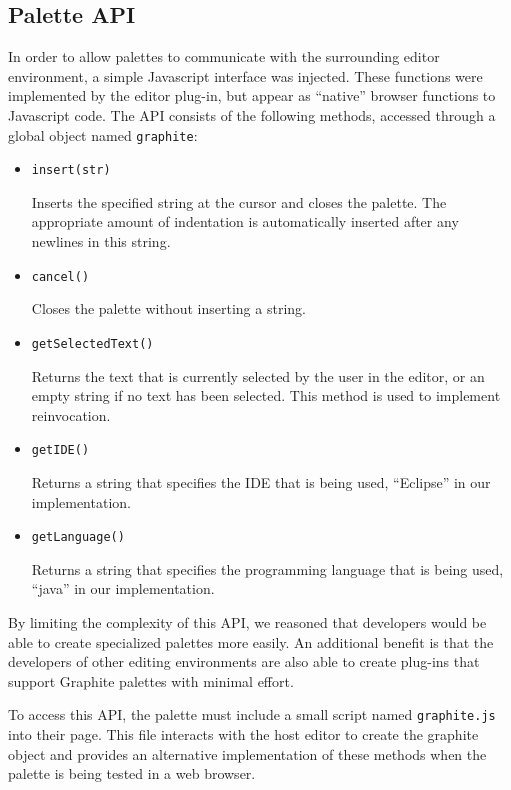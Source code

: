 \documentclass[10pt, conference, compsocconf]{IEEEtran}
\begin{document}
\subsection{Palette API}
In order to allow palettes to communicate with the surrounding editor environment, a simple Javascript interface was injected. These functions were implemented by the editor plug-in, but appear as ``native'' browser functions to Javascript code. The API consists of the following methods, accessed through a global object named \verb|graphite|:
\begin{itemize}
	\item \verb|insert(str)|
	
	Inserts the specified string at the cursor and closes the palette. The appropriate amount of indentation is automatically inserted after any newlines in this string.
	
	\item \verb|cancel()|
	
	Closes the palette without inserting a string.
	
	\item \verb|getSelectedText()|
	
	Returns the text that is currently selected by the user in the editor, or an empty string if no text has been selected. This method is used to implement reinvocation.
	
	\item \verb|getIDE()|
	
	Returns a string that specifies the IDE that is being used, ``Eclipse'' in our implementation.
	
	\item \verb|getLanguage()|
	
	Returns a string that specifies the programming language that is being used, ``java'' in our implementation.
\end{itemize}

By limiting the complexity of this API, we reasoned that developers would be able to create specialized palettes more easily. An additional benefit is that the developers of other editing environments are also able to create plug-ins that support Graphite palettes with minimal effort.

To access this API, the palette must include a small script named \verb|graphite.js| into their page. This file interacts with the host editor to create the graphite object and provides an alternative implementation of these methods when the palette is being tested in a web browser.
\end{document}
